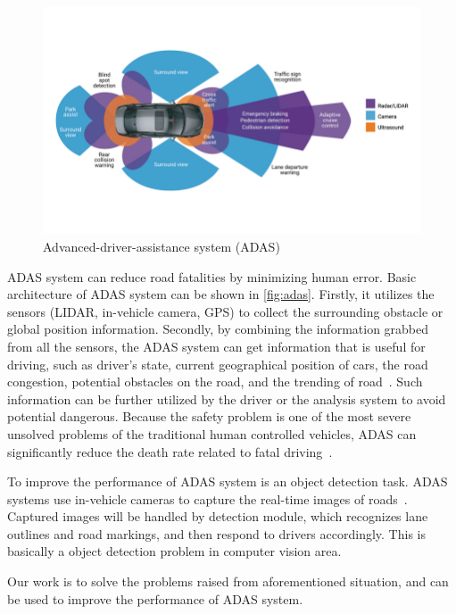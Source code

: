 \begin{spacing}{1.5}
\begin{figure}[ht]
\centering
\includegraphics[width=5.5in, fbox]{Chapter1/adas.jpg}
\caption{Advanced-driver-assistance system (ADAS)~\cite{adas}}
\label{fig:adas} 
\end{figure}

ADAS system can reduce road fatalities by minimizing human error. Basic architecture of ADAS system can be shown in \autoref{fig:adas}. Firstly, it utilizes the sensors (LIDAR, in-vehicle camera, GPS) to collect the surrounding obstacle or global position information. Secondly, by combining the information grabbed from all the sensors, the ADAS system can get information that is useful for driving, such as driver's state, current geographical position of cars, the road congestion, potential obstacles on the road, and the trending of road~\cite{morignot2014arbitration}. Such information can be further utilized by the driver or the analysis system to avoid potential dangerous. Because the safety problem is one of the most severe unsolved problems of the traditional human controlled vehicles, ADAS can significantly reduce the death rate related to fatal driving~\cite{brookhuis2001behavioural}.

To improve the performance of ADAS system is an object detection task. ADAS systems use in-vehicle cameras to capture the real-time images of roads~\cite{ziebinski2016survey}. Captured images will be handled by detection module, which recognizes lane outlines and road markings, and then respond to drivers accordingly. This is basically a object detection problem in computer vision area. 

Our work is to solve the problems raised from aforementioned situation, and can be used to improve the performance of ADAS system. 


\end{spacing}
